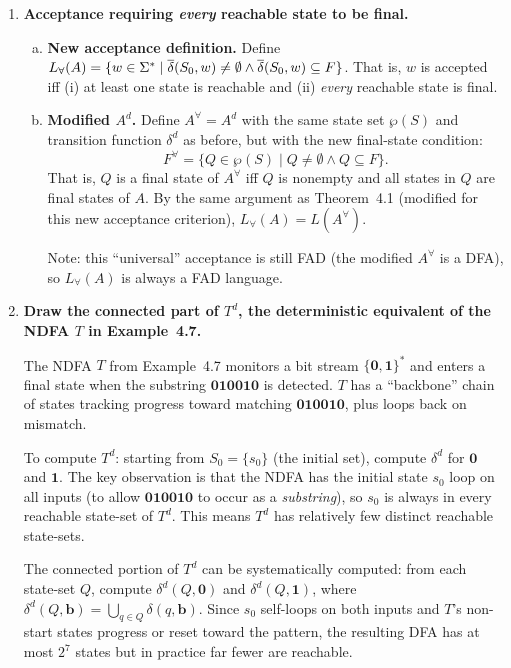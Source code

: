 \begin{enumerate}[{4.}1.]
\item \textbf{Acceptance requiring \emph{every} reachable state to be final.}

\begin{enumerate}[(a)]
  \item \textbf{New acceptance definition.}  Define
  $L_{\forall}(A)=\{w\in\Sigma^*\mid\overline{\delta}(S_0,w)\neq\emptyset\wedge\overline{\delta}(S_0,w)\subseteq F\}$.
  That is, $w$ is accepted iff (i) at least one state is reachable and
  (ii) \emph{every} reachable state is final.

  \item \textbf{Modified $A^d$.}  Define $A^{\forall}=A^d$ with the same
  state set $\wp(S)$ and transition function $\delta^d$ as before, but with
  the new final-state condition:
  \[
    F^{\forall}=\{Q\in\wp(S)\mid Q\neq\emptyset\wedge Q\subseteq F\}.
  \]
  That is, $Q$ is a final state of $A^{\forall}$ iff $Q$ is nonempty and
  all states in $Q$ are final states of $A$.  By the same argument as
  Theorem~4.1 (modified for this new acceptance criterion),
  $L_{\forall}(A)=L(A^{\forall})$.

  Note: this ``universal'' acceptance is still FAD (the modified $A^{\forall}$
  is a DFA), so $L_{\forall}(A)$ is always a FAD language.
\end{enumerate}

\item \textbf{Draw the connected part of $T^d$, the deterministic equivalent of
the NDFA $T$ in Example~4.7.}

The NDFA $T$ from Example~4.7 monitors a bit stream $\{\pmb{0},\pmb{1}\}^*$ and
enters a final state when the substring $\pmb{010010}$ is detected.  $T$ has a
``backbone'' chain of states tracking progress toward matching $\pmb{010010}$,
plus loops back on mismatch.

To compute $T^d$: starting from $S_0=\{s_0\}$ (the initial set), compute
$\delta^d$ for $\pmb{0}$ and $\pmb{1}$.  The key observation is that the NDFA
has the initial state $s_0$ loop on all inputs (to allow $\pmb{010010}$ to occur
as a \emph{substring}), so $s_0$ is always in every reachable state-set of $T^d$.
This means $T^d$ has relatively few distinct reachable state-sets.

The connected portion of $T^d$ can be systematically computed: from each
state-set $Q$, compute $\delta^d(Q,\pmb{0})$ and $\delta^d(Q,\pmb{1})$, where
$\delta^d(Q,\pmb{b})=\bigcup_{q\in Q}\delta(q,\pmb{b})$.  Since $s_0$
self-loops on both inputs and $T$'s non-start states progress or reset toward
the pattern, the resulting DFA has at most $2^7$ states but in practice far fewer
are reachable.


\end{enumerate}
